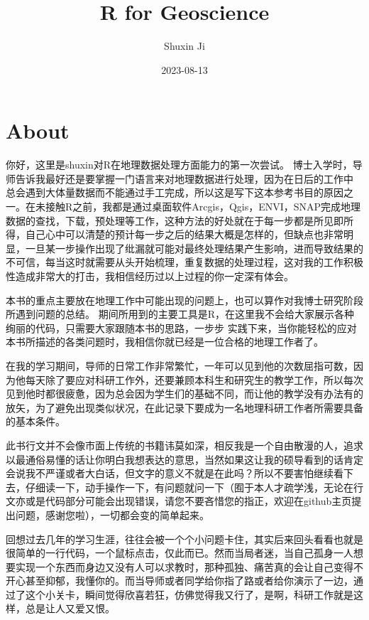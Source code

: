 \documentclass[
]{book}
\title{R for Geoscience}
\author{Shuxin Ji}
\date{2023-08-13}
\begin{document}
\maketitle

{
\setcounter{tocdepth}{1}
\tableofcontents
}
\hypertarget{about}{%
\chapter*{About}\label{about}}

你好，这里是shuxin对R在地理数据处理方面能力的第一次尝试。 博士入学时，导师告诉我最好还是要掌握一门语言来对地理数据进行处理，因为在日后的工作中 总会遇到大体量数据而不能通过手工完成，所以这是写下这本参考书目的原因之一。在未接触R之前，我都是通过桌面软件Arcgis，Qgis，ENVI，SNAP完成地理数据的查找，下载，预处理等工作，这种方法的好处就在于每一步都是所见即所得，自己心中可以清楚的预计每一步之后的结果大概是怎样的，但缺点也非常明显，一旦某一步操作出现了纰漏就可能对最终处理结果产生影响，进而导致结果的不可信，每当这时就需要从头开始梳理，重复数据的处理过程，这对我的工作积极性造成非常大的打击，我相信经历过以上过程的你一定深有体会。

本书的重点主要放在地理工作中可能出现的问题上，也可以算作对我博士研究阶段所遇到问题的总结。 期间所用到的主要工具是R，在这里我不会给大家展示各种绚丽的代码，只需要大家跟随本书的思路，一步步 实践下来，当你能轻松的应对本书所描述的各类问题时，我相信你就已经是一位合格的地理工作者了。

在我的学习期间，导师的日常工作非常繁忙，一年可以见到他的次数屈指可数，因为他每天除了要应对科研工作外，还要兼顾本科生和研究生的教学工作，所以每次见到他时都很疲惫，因为总会因为学生们的基础不同，而让他的教学没有办法有的放矢，为了避免出现类似状况，在此记录下要成为一名地理科研工作者所需要具备的基本条件。

此书行文并不会像市面上传统的书籍讳莫如深，相反我是一个自由散漫的人，追求以最通俗易懂的话让你明白我想表达的意思，当然如果这让我的硕导看到的话肯定会说我不严谨或者大白话，但文字的意义不就是在此吗？所以不要害怕继续看下去，仔细读一下，动手操作一下，有问题就问一下（囿于本人才疏学浅，无论在行文亦或是代码部分可能会出现错误，请您不要吝惜您的指正，欢迎在github主页提出问题，感谢您啦），一切都会变的简单起来。

回想过去几年的学习生涯，往往会被一个个小问题卡住，其实后来回头看看也就是很简单的一行代码，一个鼠标点击，仅此而已。然而当局者迷，当自己孤身一人想要实现一个东西而身边又没有人可以求教时，那种孤独、痛苦真的会让自己变得不开心甚至抑郁，我懂你的。而当导师或者同学给你指了路或者给你演示了一边，通过了这个小关卡，瞬间觉得欣喜若狂，仿佛觉得我又行了，是啊，科研工作就是这样，总是让人又爱又恨。
\end{document}
